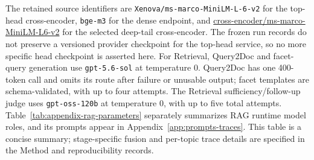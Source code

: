 The retained source identifiers are
\texttt{Xenova/ms-marco-MiniLM-L-6-v2} for the top-head cross-encoder,
\texttt{bge-m3} for the dense endpoint, and
\url{cross-encoder/ms-marco-MiniLM-L6-v2} for the selected deep-tail
cross-encoder. The frozen
run records do not preserve a versioned provider checkpoint for the
top-head service, so no more specific head checkpoint is asserted here.
For Retrieval, Query2Doc and facet-query generation use \texttt{gpt-5.6-sol}
at temperature 0. Query2Doc has one 400-token call and omits its route after
failure or unusable output; facet templates are schema-validated, with up to
four attempts. The Retrieval sufficiency/follow-up judge uses
\texttt{gpt-oss-120b} at temperature 0, with up to five total attempts.
Table~\ref{tab:appendix-rag-parameters} separately summarizes RAG runtime
model roles, and its prompts appear in
Appendix~\ref{app:prompts-traces}. This table is a concise summary;
stage-specific fusion and per-topic trace details are specified in the
Method and reproducibility records.
